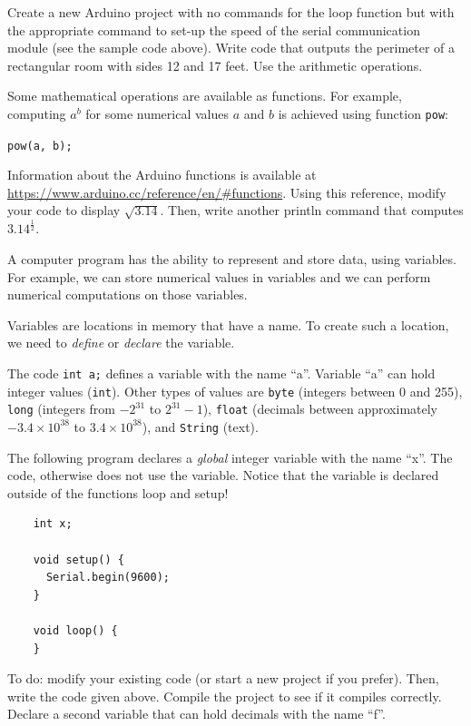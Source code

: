 \documentclass[12pt]{book}
\begin{document}
\begin{compactitem}[--]
  Create a new Arduino project with no commands for the loop function
  but with the appropriate command to set-up the speed of the serial
  communication module (see the sample code above). Write code that
  outputs the perimeter of a rectangular room with sides 12 and 17
  feet. Use the arithmetic operations.

\item Some mathematical operations are available as functions. For
  example, computing $a^b$ for some numerical values $a$ and $b$ is
  achieved using function \texttt{pow}:

  \lstinline$pow(a, b);$
  
  Information about the Arduino functions is available at
  \url{https://www.arduino.cc/reference/en/#functions}. Using
  this reference, modify your code to display
  $\sqrt{3.14}$. Then, write another println command that computes
  $3.14^\frac{1}{2}$.  
  
\item A computer program has the ability to represent and store data,
  using variables. For example, we can store numerical values in
  variables and we can perform numerical computations on those
  variables.

  Variables are locations in memory that have a name. To create such a
  location, we need to \emph{define} or \emph{declare} the
  variable. 

  The code \lstinline$int a;$ defines a variable with the name ``a''. Variable
  ``a'' can hold integer values (\lstinline$int$). Other types of
  values are \lstinline$byte$ (integers between 0 and 255),
  \lstinline$long$ (integers from $-2^{31}$ to $2^{31}-1$),
  \lstinline$float$ (decimals between approximately $-3.4 \times
  10^{38}$ to $3.4 \times 10^{38}$), and \lstinline$String$ (text).

  The following program declares a \emph{global} integer variable with
  the name ``x''. The code, otherwise does not use the
  variable. Notice that the variable is declared outside of the
  functions loop and setup!

  \begin{lstlisting}
    int x;

    void setup() {
      Serial.begin(9600);
    }

    void loop() {
    }
  \end{lstlisting}

  To do: modify your existing code (or start a new project if you
  prefer). Then, write the code given above. Compile the project to
  see if it compiles correctly. Declare a second variable that can
  hold decimals with the name ``f''.


\end{compactitem}
\end{document}
